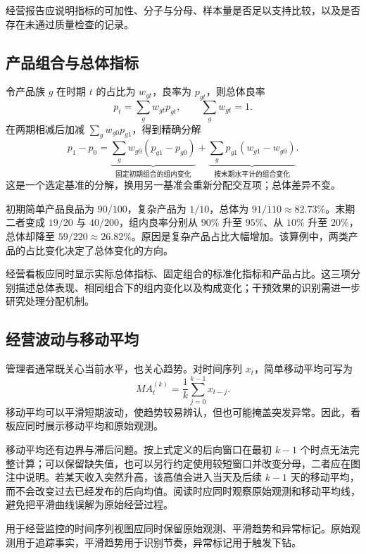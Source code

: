 经营报告应说明指标的可加性、分子与分母、样本量是否足以支持比较，以及是否存在未通过质量检查的记录。

\subsection{产品组合与总体指标}
令产品族 \(g\) 在时期 \(t\) 的占比为 \(w_{gt}\)，良率为 \(p_{gt}\)，则总体良率
\[
p_t=\sum_gw_{gt}p_{gt},\qquad \sum_gw_{gt}=1.
\]
在两期相减后加减 \(\sum_gw_{g0}p_{g1}\)，得到精确分解
\[
p_1-p_0
=\underbrace{\sum_gw_{g0}(p_{g1}-p_{g0})}_{\text{固定初期组合的组内变化}}
+\underbrace{\sum_gp_{g1}(w_{g1}-w_{g0})}_{\text{按末期水平计的组合变化}}.
\]
这是一个选定基准的分解，换用另一基准会重新分配交互项；总体差异不变。

\begin{example}
初期简单产品良品为 \(90/100\)，复杂产品为 \(1/10\)，总体为 \(91/110\approx82.73\%\)。末期二者变成 \(19/20\) 与 \(40/200\)，组内良率分别从 \(90\%\) 升至 \(95\%\)、从 \(10\%\) 升至 \(20\%\)，总体却降至 \(59/220\approx26.82\%\)。原因是复杂产品占比大幅增加。该算例中，两类产品的占比变化决定了总体变化的方向。
\end{example}

经营看板应同时显示实际总体指标、固定组合的标准化指标和产品占比。这三项分别描述总体表现、相同组合下的组内变化以及构成变化；干预效果的识别需进一步研究处理分配机制。

\subsection{经营波动与移动平均}

管理者通常既关心当前水平，也关心趋势。对时间序列 \(x_t\)，简单移动平均可写为
\[
MA_t^{(k)}=\frac{1}{k}\sum_{j=0}^{k-1}x_{t-j}.
\]
移动平均可以平滑短期波动，使趋势较易辨认，但也可能掩盖突发异常。因此，看板应同时展示移动平均和原始观测。

移动平均还有边界与滞后问题。按上式定义的后向窗口在最初 \(k-1\) 个时点无法完整计算；可以保留缺失值，也可以另行约定使用较短窗口并改变分母，二者应在图注中说明。若某天收入突然升高，该高值会进入当天及后续 \(k-1\) 天的移动平均，而不会改变过去已经发布的后向均值。阅读时应同时观察原始观测和移动平均线，避免把平滑曲线误解为原始经营过程。

\begin{convention}[平滑与异常并存]
用于经营监控的时间序列视图应同时保留原始观测、平滑趋势和异常标记。原始观测用于追踪事实，平滑趋势用于识别节奏，异常标记用于触发下钻。
\end{convention}

